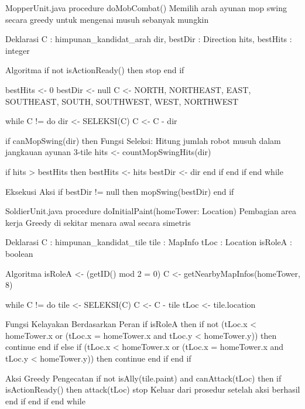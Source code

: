 \begin{pseudocode}{MopperUnit.java}
    procedure doMobCombat()
    { Memilih arah ayunan mop swing secara greedy untuk mengenai musuh sebanyak mungkin }

    { Deklarasi }
    C : himpunan_kandidat_arah
    dir, bestDir : Direction
    hits, bestHits : integer

    { Algoritma }
    if not isActionReady() then stop end if

    bestHits <- 0
    bestDir <- null
    C <- {NORTH, NORTHEAST, EAST, SOUTHEAST, SOUTH, SOUTHWEST, WEST, NORTHWEST}

    while C != {} do
        dir <- SELEKSI(C)
        C <- C - {dir}

        if canMopSwing(dir) then
            { Fungsi Seleksi: Hitung jumlah robot musuh dalam jangkauan ayunan 3-tile }
            hits <- countMopSwingHits(dir)

            if hits > bestHits then
                bestHits <- hits
                bestDir <- dir
            end if
        end if
    end while

    { Eksekusi Aksi }
    if bestDir != null then
        mopSwing(bestDir)
    end if
\end{pseudocode}

\begin{pseudocode}{SoldierUnit.java}
    procedure doInitialPaint(homeTower: Location)
    { Pembagian area kerja Greedy di sekitar menara awal secara simetris }

    { Deklarasi }
    C : himpunan_kandidat_tile
    tile : MapInfo
    tLoc : Location
    isRoleA : boolean

    { Algoritma }
    isRoleA <- (getID() mod 2 = 0)
    C <- getNearbyMapInfos(homeTower, 8)

    while C != {} do
        tile <- SELEKSI(C)
        C <- C - {tile}
        tLoc <- tile.location

        { Fungsi Kelayakan Berdasarkan Peran }
        if isRoleA then
            if not (tLoc.x < homeTower.x or (tLoc.x = homeTower.x and tLoc.y < homeTower.y)) then 
                continue 
            end if
        else
            if (tLoc.x < homeTower.x or (tLoc.x = homeTower.x and tLoc.y < homeTower.y)) then 
                continue 
            end if
        end if

        { Aksi Greedy Pengecatan }
        if not isAlly(tile.paint) and canAttack(tLoc) then
            if isActionReady() then
                attack(tLoc)
                stop { Keluar dari prosedur setelah aksi berhasil }
            end if
        end if
    end while
\end{pseudocode}

